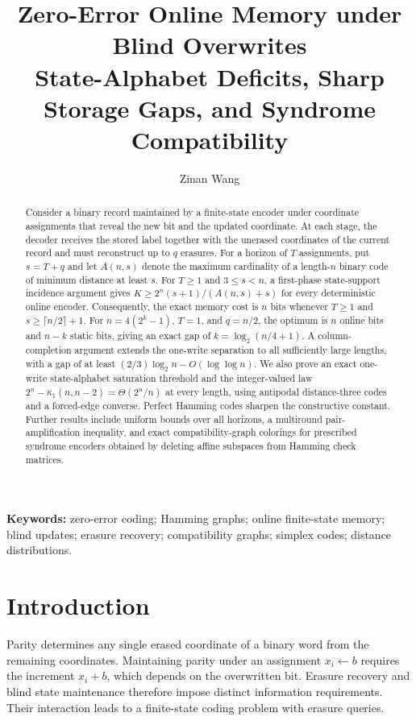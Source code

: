 \documentclass[11pt,a4paper]{article}
\title{\textbf{Zero-Error Online Memory under Blind Overwrites}\\[4pt]\large State-Alphabet Deficits, Sharp Storage Gaps, and Syndrome Compatibility}
\author{Zinan Wang}
\date{}
\begin{document}
\maketitle
\begin{abstract}
Consider a binary record maintained by a finite-state encoder under coordinate assignments that reveal the new bit and the updated coordinate. At each stage, the decoder receives the stored label together with the unerased coordinates of the current record and must reconstruct up to $q$ erasures. For a horizon of $T$ assignments, put $s=T+q$ and let $A(n,s)$ denote the maximum cardinality of a length-$n$ binary code of minimum distance at least $s$. For $T\ge1$ and $3\le s<n$, a first-phase state-support incidence argument gives $K\ge 2^n(s+1)/(A(n,s)+s)$ for every deterministic online encoder. Consequently, the exact memory cost is $n$ bits whenever $T\ge1$ and $s\ge\lceil n/2\rceil+1$. For $n=4(2^k-1)$, $T=1$, and $q=n/2$, the optimum is $n$ online bits and $n-k$ static bits, giving an exact gap of $k=\log_2(n/4+1)$. A column-completion argument extends the one-write separation to all sufficiently large lengths, with a gap of at least $(2/3)\log_2 n-O(\log\log n)$. We also prove an exact one-write state-alphabet saturation threshold and the integer-valued law $2^n-\kappa_1(n,n-2)=\Theta(2^n/n)$ at every length, using antipodal distance-three codes and a forced-edge converse. Perfect Hamming codes sharpen the constructive constant. Further results include uniform bounds over all horizons, a multiround pair-amplification inequality, and exact compatibility-graph colorings for prescribed syndrome encoders obtained by deleting affine subspaces from Hamming check matrices.
\end{abstract}
\noindent\textbf{Keywords:} zero-error coding; Hamming graphs; online finite-state memory; blind updates; erasure recovery; compatibility graphs; simplex codes; distance distributions.

\section{Introduction}
Parity determines any single erased coordinate of a binary word from the remaining coordinates. Maintaining parity under an assignment $x_i\gets b$ requires the increment $x_i+b$, which depends on the overwritten bit. Erasure recovery and blind state maintenance therefore impose distinct information requirements. Their interaction leads to a finite-state coding problem with erasure queries.
\end{document}
